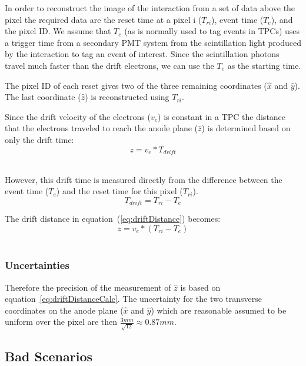 In order to reconstruct the image of the interaction from a set of data above the pixel the required data are the reset time at a pixel i ($T_{ri}$), event time ($T_{e}$), and the pixel ID.
We assume that $T_{e}$ (as is normally used to tag events in TPCs) uses a trigger time from a secondary PMT system from the scintillation light produced by the interaction to tag an event of interest.
Since the scintillation photons travel much faster than the drift electrons, we can use the $T_{e}$ as the starting time.

The pixel ID of each reset gives two of the three remaining coordinates ($\hat{x}$ and $\hat{y}$).
The last coordinate ($\hat{z}$) is reconstructed using $T_{ri}$.

Since the drift velocity of the electrons ($v_{e}$) is constant in a TPC the distance that the electrons traveled to reach the anode plane ($\hat{z}$) is determined based on only the drift time:
\begin{equation}
  z = v_{e} * T_{drift}
\end{equation}~\label{eq:driftDistance}

However, this drift time is measured directly from the difference between the event time ($T_{e}$) and the reset time for this pixel ($T_{ri}$).
\begin{equation}
  T_{drift} = T_{ri} - T_{e}
\end{equation}

The drift distance in equation~(\ref{eq:driftDistance}) becomes:
\begin{equation}
  z = v_{e} * (T_{ri} - T_{e})
\end{equation}~\label{eq:driftDistanceCalc}

\subsubsection{Uncertainties}

Therefore the precision of the measurement of $\hat{z}$ is based on equation~\ref{eq:driftDistanceCalc}.
The uncertainty for the two transverse coordinates on the anode plane ($\hat{x}$ and $\hat{y}$) which are reasonable assumed to be uniform over the pixel are then $\frac{3 mm}{\sqrt{12}} \approx 0.87 mm$.


\subsection{Bad Scenarios}

